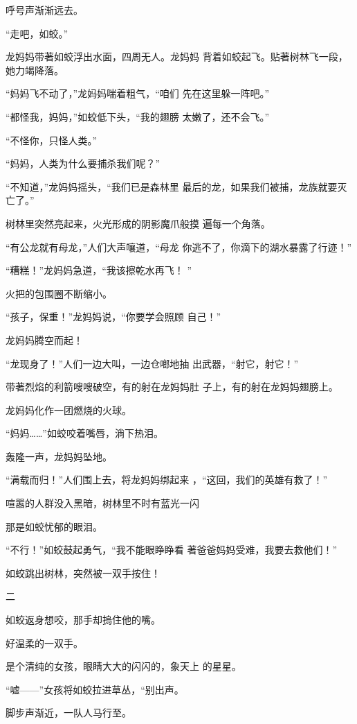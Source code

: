 \documentclass{article}
\begin{document}
呼号声渐渐远去。 


“走吧，如蛟。” 

龙妈妈带著如蛟浮出水面，四周无人。龙妈妈
背着如蛟起飞。贴著树林飞一段，她力竭降落。 

“妈妈飞不动了，”龙妈妈喘着粗气，“咱们
先在这里躲一阵吧。” 

\newpage

“都怪我，妈妈，”如蛟低下头，“我的翅膀
太嫩了，还不会飞。” 


“不怪你，只怪人类。” 


“妈妈，人类为什么要捕杀我们呢？” 

“不知道，”龙妈妈摇头，“我们已是森林里
最后的龙，如果我们被捕，龙族就要灭亡了。” 

树林里突然亮起来，火光形成的阴影魔爪般摸
遍每一个角落。 

“有公龙就有母龙，”人们大声嚷道，“母龙
你逃不了，你滴下的湖水暴露了行迹！” 

“糟糕！”龙妈妈急道，“我该擦乾水再飞！
” 


火把的包围圈不断缩小。 

\newpage

“孩子，保重！”龙妈妈说，“你要学会照顾
自己！” 


龙妈妈腾空而起！ 

“龙现身了！”人们一边大叫，一边仓啷地抽
出武器，“射它，射它！” 

带著烈焰的利箭嗖嗖破空，有的射在龙妈妈肚
子上，有的射在龙妈妈翅膀上。 


龙妈妈化作一团燃烧的火球。 


“妈妈……”如蛟咬着嘴唇，淌下热泪。 


轰隆一声，龙妈妈坠地。 

“满载而归！”人们围上去，将龙妈妈绑起来
，“这回，我们的英雄有救了！” 

喧嚣的人群没入黑暗，树林里不时有蓝光一闪
\newpage



那是如蛟忧郁的眼泪。 

“不行！”如蛟鼓起勇气，“我不能眼睁睁看
著爸爸妈妈受难，我要去救他们！” 


如蛟跳出树林，突然被一双手按住！ 


二 


如蛟返身想咬，那手却摀住他的嘴。 


好温柔的一双手。 

是个清纯的女孩，眼睛大大的闪闪的，象天上
的星星。 

“嘘——”女孩将如蛟拉进草丛，“别出声。


脚步声渐近，一队人马行至。 
\end{document}
